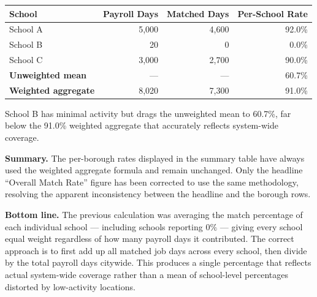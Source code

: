 \documentclass[11pt, letterpaper]{article}
\begin{document}
\begin{center}
\renewcommand{\arraystretch}{1.3}
\begin{tabular}{lrrr}
\toprule
\textbf{School} & \textbf{Payroll Days} & \textbf{Matched Days} & \textbf{Per-School Rate} \\
\midrule
School A & 5{,}000 & 4{,}600 & 92.0\% \\
School B &    20   &     0   &  0.0\% \\
School C & 3{,}000 & 2{,}700 & 90.0\% \\
\midrule
\textbf{Unweighted mean}  & ---      & ---      & 60.7\% \\
\textbf{Weighted aggregate} & 8{,}020 & 7{,}300 & 91.0\% \\
\bottomrule
\end{tabular}
\end{center}

School B has minimal activity but drags the unweighted mean to 60.7\%,
far below the 91.0\% weighted aggregate that accurately reflects system-wide
coverage.

\bigskip

\textbf{Summary.} The per-borough rates displayed in the summary table have
always used the weighted aggregate formula and remain unchanged. Only the
headline ``Overall Match Rate'' figure has been corrected to use the same
methodology, resolving the apparent inconsistency between the headline and
the borough rows.

\bigskip

\textbf{Bottom line.} The previous calculation was averaging the match
percentage of each individual school --- including schools reporting $0\%$
--- giving every school equal weight regardless of how many payroll days it
contributed. The correct approach is to first add up all matched job days
across every school, then divide by the total payroll days citywide. This
produces a single percentage that reflects actual system-wide coverage rather
than a mean of school-level percentages distorted by low-activity locations.
\end{document}
